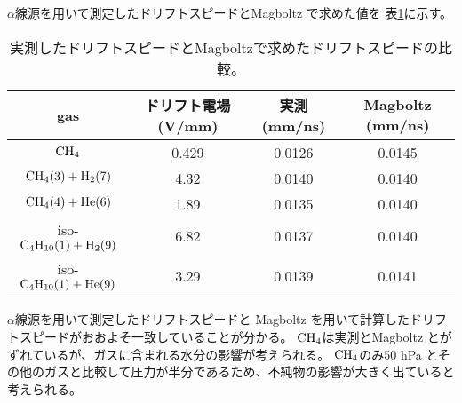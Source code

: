 \documentclass[../master]{subfiles}
\begin{document}
$\alpha$線源を用いて測定したドリフトスピードとMagboltz で求めた値を
表\ref{tab::drift_speed_compare}に示す。
\begin{table}
  \centering
  \caption{実測したドリフトスピードとMagboltzで求めたドリフトスピードの比較。}
  \label{tab::drift_speed_compare}
  \begin{tabular}{cccc}
    \toprule
    gas & ドリフト電場 (V/mm) & 実測 (mm/ns) & Magboltz (mm/ns)\\
    \midrule
    ${\rm CH_{4}}$ & 0.429 & 0.0126 & 0.0145 \\
    ${\rm CH_{4}} (3) + {\rm H_{2}} (7)$ & 4.32 & 0.0140 & 0.0140 \\
    ${\rm CH_{4}} (4) + {\rm He} (6)$ & 1.89 & 0.0135 & 0.0140 \\
    iso-${\rm C_{4}H_{10}} (1) + {\rm H_{2}} (9)$ & 6.82 & 0.0137 & 0.0140 \\
    iso-${\rm C_{4}H_{10}} (1) + {\rm He} (9)$ & 3.29 & 0.0139 & 0.0141 \\
    \bottomrule
  \end{tabular}
\end{table}
$\alpha$線源を用いて測定したドリフトスピードと Magboltz を用いて計算したドリフトスピードがおおよそ一致していることが分かる。
$\rm CH_{4}$は実測とMagboltz とがずれているが、ガスに含まれる水分の影響が考えられる。
$\rm CH_{4}$のみ50 hPa とその他のガスと比較して圧力が半分であるため、不純物の影響が大きく出ていると考えられる。
\end{document}
